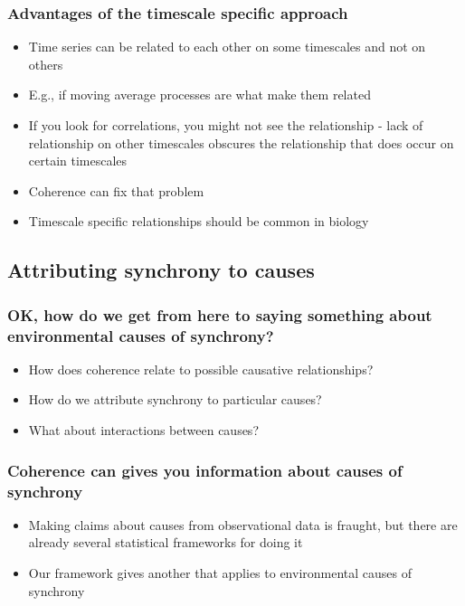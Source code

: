 \documentclass{beamer}
\begin{document}
{
\begin{frame}
\frametitle{Advantages of the timescale specific approach}
\begin{itemize}
\item Time series can be related to each other on some timescales and not on others
\item E.g., if moving average processes are what make them related
\item If you look for correlations, you might not see the relationship - lack of relationship on other timescales obscures the relationship that does occur on certain timescales
\item Coherence can fix that problem
\item Timescale specific relationships should be common in biology
\end{itemize}
\end{frame}}

\subsection{Attributing synchrony to causes}

{
\begin{frame}
\frametitle{OK, how do we get from here to saying something about environmental causes of synchrony?}
\begin{itemize}
\item How does coherence relate to possible causative relationships?
\item How do we attribute synchrony to particular causes? 
\item What about interactions between causes?
\end{itemize}
\end{frame}}

\begin{frame}
\frametitle{Coherence can gives you information about causes of synchrony}
\begin{itemize}
\item Making claims about causes from observational data is fraught, but there are already several statistical frameworks for doing it
\item Our framework gives another that applies to environmental causes of synchrony
\end{itemize}
\end{frame}
\end{document}
